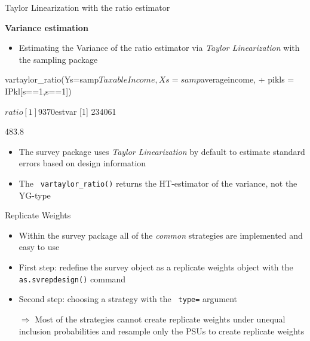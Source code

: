 \documentclass[11pt,german,hideothersubsections]{beamer}
\newcommand{\R}[1]{{\tt \color{blue}  #1}}
\begin{document}
\begin{frame}[fragile]{Taylor Linearization} {with the ratio estimator}
\footnotesize{
\begin{center}
\textbf{Variance estimation}
\end{center}
\begin{itemize}
\item Estimating the Variance of the ratio estimator via \emph{Taylor Linearization} with the sampling package
\end{itemize}
\scriptsize{
\begin{Schunk}
\begin{Sinput}
 vartaylor_ratio(Ys=samp$TaxableIncome,Xs=samp$averageincome,
+                 pikls = IPkl[s==1,s==1])
\end{Sinput}
\begin{Soutput}
$ratio
[1] 9370

$estvar
[1] 234061
\end{Soutput}
\end{Schunk}
\begin{Schunk}
\begin{Soutput}
[1] 483.8
\end{Soutput}
\end{Schunk}
}
\begin{itemize}
\pause\item The survey package uses \emph{Taylor Linearization} by default to estimate standard errors based on design information
\pause\item The \R{vartaylor\_ratio()} returns the HT-estimator of the variance, not the YG-type
\end{itemize}
}
\end{frame}
\begin{frame}[fragile]{Replicate Weights}
\footnotesize{
\begin{itemize}
\item Within the survey package all of the \emph{common} strategies are implemented and easy to use
\item First step: redefine the survey object as a replicate weights object with the \R{as.svrepdesign()} command
\item Second step: choosing a strategy with the \R{type=} argument
\pause\item[$\Rightarrow$] Most of the strategies cannot create replicate weights under unequal inclusion probabilities and resample only the PSUs to create replicate weights
\end{itemize}
}
\end{frame}
\end{document}
